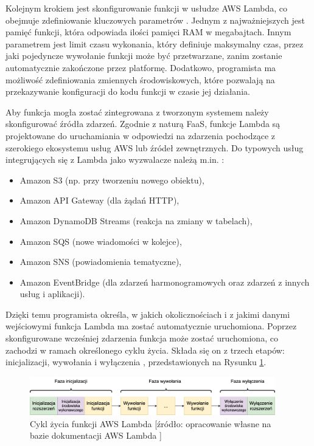 Kolejnym krokiem jest skonfigurowanie funkcji w usłudze AWS Lambda, co obejmuje zdefiniowanie kluczowych parametrów \cite{awsLambdaDocs}.
Jednym z najważniejszych jest pamięć funkcji, która odpowiada ilości pamięci RAM w megabajtach.
Innym parametrem jest limit czasu wykonania, który definiuje maksymalny czas, przez jaki pojedyncze wywołanie funkcji może być przetwarzane, zanim zostanie automatycznie zakończone przez platformę. 
Dodatkowo, programista ma możliwość zdefiniowania zmiennych środowiskowych, które pozwalają na przekazywanie konfiguracji do kodu funkcji w czasie jej działania.

Aby funkcja mogła zostać zintegrowana z tworzonym systemem należy skonfigurować źródła zdarzeń.
Zgodnie z naturą FaaS, funkcje Lambda są projektowane do uruchamiania w odpowiedzi na zdarzenia pochodzące z szerokiego ekosystemu usług AWS lub źródeł zewnętrznych.
Do typowych usług integrujących się z Lambda jako wyzwalacze należą m.in. \cite{awsLambdaDocs}:
\begin{itemize}
    \item Amazon S3 (np. przy tworzeniu nowego obiektu),
    \item Amazon API Gateway (dla żądań HTTP),
    \item Amazon DynamoDB Streams (reakcja na zmiany w tabelach),
    \item Amazon SQS (nowe wiadomości w kolejce),
    \item Amazon SNS (powiadomienia tematyczne),
    \item Amazon EventBridge (dla zdarzeń harmonogramowych oraz zdarzeń z innych usług i aplikacji).
\end{itemize}
Dzięki temu programista określa, w jakich okolicznościach i z jakimi danymi wejściowymi funkcja Lambda ma zostać automatycznie uruchomiona.
Poprzez skonfigurowane wcześniej zdarzenia funkcja może zostać uruchomiona, co zachodzi w ramach określonego cyklu życia.
Składa się on z trzech etapów: inicjalizacji, wywołania i wyłączenia \cite{awsLambdaDocs}, przedstawionych na Rysunku \ref{fig:aws_lambda_lifecycle}.

\begin{figure}[h]
    \centering
    \includegraphics[width=0.95\textwidth]{charts/aws_lambda_lifecycle.drawio.png}
    \caption{Cykl życia funkcji AWS Lambda [źródło: opracowanie własne na bazie dokumentacji AWS Lambda \cite{awsLambdaDocs}]}
    \label{fig:aws_lambda_lifecycle}    
\end{figure}

